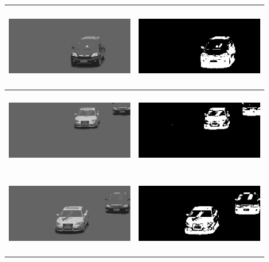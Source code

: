 \documentclass[a4paper]{article}
\begin{document}
\begin{itemize}[label={}]
\begin{table}[h!]
\begin{tabular}{|>{\centering\arraybackslash}m{6cm}|>{\centering\arraybackslash}m{6cm}|}
        \includegraphics[width=5.5cm,height=3.5cm]{images/answer1/frame328.jpg} & \includegraphics[width=5.5cm,height=3.5cm]{images/answer2/frame328.jpg} \\ \hline
        \includegraphics[width=5.5cm,height=3.5cm]{images/answer1/frame588.jpg} & \includegraphics[width=5.5cm,height=3.5cm]{images/answer2/frame588.jpg} \\ \hline
        \includegraphics[width=5.5cm,height=3.5cm]{images/answer1/frame613.jpg} & \includegraphics[width=5.5cm,height=3.5cm]{images/answer2/frame613.jpg} \\ \hline
        \end{tabular}
        \label{table:so-sanh}
    \end{table}
\end{itemize}
\newpage
\end{document}
